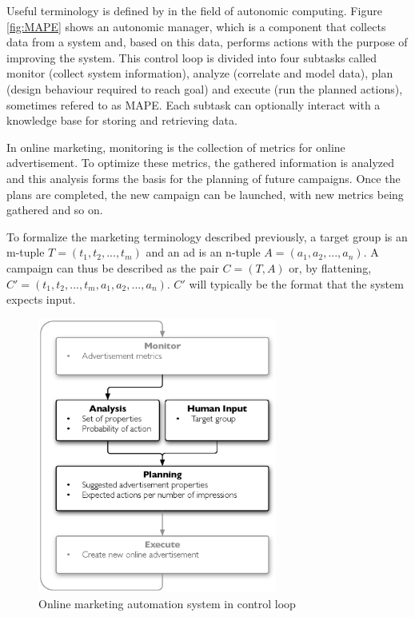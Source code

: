 \documentclass[a4paper]{article}
\begin{document}
Useful terminology is defined by \citet{IBM2006} in the field of autonomic computing. Figure \ref{fig:MAPE} shows an autonomic
manager, which is a component that collects data from a system and, based on this data, performs actions with the purpose of
improving the system. This control loop is divided into four subtasks called monitor (collect system information), analyze
(correlate and model data), plan (design behaviour required to reach goal) and execute (run the planned actions), sometimes
refered to as MAPE. Each subtask can optionally interact with a knowledge base for storing and retrieving data.

In online marketing, monitoring is the collection of metrics for online advertisement. To optimize these metrics, the gathered
information is analyzed and this analysis forms the basis for the planning of future campaigns. Once the plans are completed, the
new campaign can be launched, with new metrics being gathered and so on.

To formalize the marketing terminology described previously, a target group is an m-tuple \(T = (t_1, t_2, ..., t_m)\) and an ad is an n-tuple \(A = (a_1, a_2, ..., a_n)\). A campaign can thus be described as the pair \(C = (T, A)\) or, by flattening, \(C' = (t_1, t_2, ..., t_m, a_1, a_2, ..., a_n)\). \(C'\) will typically be the format that the system expects input.

\begin{figure}[h!]
\centering
\includegraphics[width=0.7\textwidth]{mape-marketing.eps}
\caption{Online marketing automation system in control loop}
\label{fig:MAPEMarketing}
\end{figure}
\end{document}
